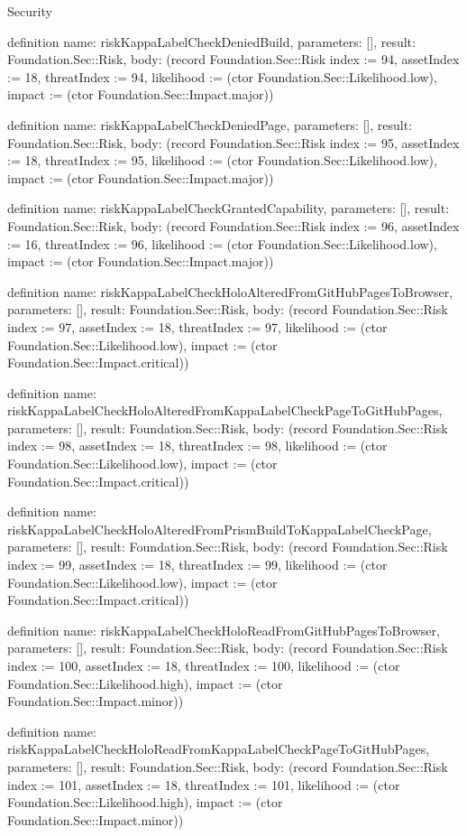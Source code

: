 \begin{lexlean}{Security}
\begin{semanticmodule}
definition{
  name: riskKappaLabelCheckDeniedBuild,
  parameters: [],
  result: Foundation.Sec::Risk,
  body: (record Foundation.Sec::Risk {index := 94, assetIndex := 18, threatIndex := 94, likelihood := (ctor Foundation.Sec::Likelihood.low), impact := (ctor Foundation.Sec::Impact.major)})
}

definition{
  name: riskKappaLabelCheckDeniedPage,
  parameters: [],
  result: Foundation.Sec::Risk,
  body: (record Foundation.Sec::Risk {index := 95, assetIndex := 18, threatIndex := 95, likelihood := (ctor Foundation.Sec::Likelihood.low), impact := (ctor Foundation.Sec::Impact.major)})
}

definition{
  name: riskKappaLabelCheckGrantedCapability,
  parameters: [],
  result: Foundation.Sec::Risk,
  body: (record Foundation.Sec::Risk {index := 96, assetIndex := 16, threatIndex := 96, likelihood := (ctor Foundation.Sec::Likelihood.low), impact := (ctor Foundation.Sec::Impact.major)})
}

definition{
  name: riskKappaLabelCheckHoloAlteredFromGitHubPagesToBrowser,
  parameters: [],
  result: Foundation.Sec::Risk,
  body: (record Foundation.Sec::Risk {index := 97, assetIndex := 18, threatIndex := 97, likelihood := (ctor Foundation.Sec::Likelihood.low), impact := (ctor Foundation.Sec::Impact.critical)})
}

definition{
  name: riskKappaLabelCheckHoloAlteredFromKappaLabelCheckPageToGitHubPages,
  parameters: [],
  result: Foundation.Sec::Risk,
  body: (record Foundation.Sec::Risk {index := 98, assetIndex := 18, threatIndex := 98, likelihood := (ctor Foundation.Sec::Likelihood.low), impact := (ctor Foundation.Sec::Impact.critical)})
}

definition{
  name: riskKappaLabelCheckHoloAlteredFromPrismBuildToKappaLabelCheckPage,
  parameters: [],
  result: Foundation.Sec::Risk,
  body: (record Foundation.Sec::Risk {index := 99, assetIndex := 18, threatIndex := 99, likelihood := (ctor Foundation.Sec::Likelihood.low), impact := (ctor Foundation.Sec::Impact.critical)})
}

definition{
  name: riskKappaLabelCheckHoloReadFromGitHubPagesToBrowser,
  parameters: [],
  result: Foundation.Sec::Risk,
  body: (record Foundation.Sec::Risk {index := 100, assetIndex := 18, threatIndex := 100, likelihood := (ctor Foundation.Sec::Likelihood.high), impact := (ctor Foundation.Sec::Impact.minor)})
}

definition{
  name: riskKappaLabelCheckHoloReadFromKappaLabelCheckPageToGitHubPages,
  parameters: [],
  result: Foundation.Sec::Risk,
  body: (record Foundation.Sec::Risk {index := 101, assetIndex := 18, threatIndex := 101, likelihood := (ctor Foundation.Sec::Likelihood.high), impact := (ctor Foundation.Sec::Impact.minor)})
}


\end{semanticmodule}
\end{lexlean}
